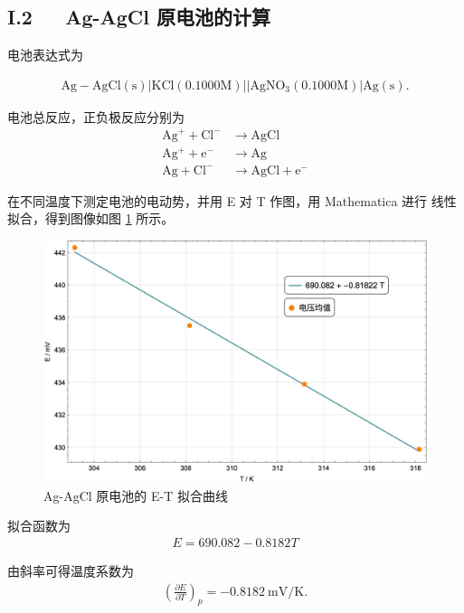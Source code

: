 \documentclass[12pt]{ctexart}
\numberwithin{equation}{section}
\begin{document}
\subsection*{I.2~~~Ag-AgCl 原电池的计算}

电池表达式为

\begin{align}
    \mathrm{Ag-AgCl(s)}|\mathrm{KCl}(0.1000 \mathrm{M})
    ||\mathrm{AgNO_3}(0.1000 \mathrm{M})|\mathrm{Ag(s)}.
    \tag{I.8}
\end{align}

电池总反应，正负极反应分别为
\begin{align}
    \mathrm{Ag^{+} + Cl^{-} }&\mathrm{\longrightarrow AgCl}
    \tag{I.9} \\
    \mathrm{Ag^{+} + e^{-} }&\mathrm{\longrightarrow Ag}
    \tag{I.10} \\
    \mathrm{Ag + Cl^{-} }&\mathrm{\longrightarrow AgCl + e^{-}}
    \tag{I.11}
\end{align}

在不同温度下测定电池的电动势，并用 E 对 T 作图，用 Mathematica 进行
线性拟合，得到图像如图 \ref*{fig:fit} 所示。

\begin{figure}[htbp]
    \centering
    \includegraphics[scale=0.4]{Figure_1.jpg}
    \caption{Ag-AgCl 原电池的 E-T 拟合曲线}
    \label{fig:fit}
\end{figure}

拟合函数为
\begin{align}
    E = 690.082- 0.8182 T  \tag{I.12}
\end{align}

由斜率可得温度系数为
\begin{align}
    \left(\frac{\partial E}{\partial T}\right)_p
    = - 0.8182~\mathrm{mV/K}. \tag{I.13}
\end{align}
\end{document}
